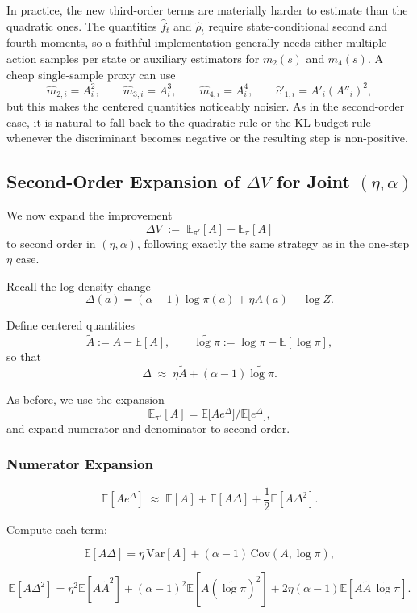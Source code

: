 \documentclass[11pt]{article}
\theoremstyle{definition}
\theoremstyle{remark}
\begin{document}
In practice, the new third-order terms are materially harder to estimate than the quadratic ones. The quantities $\hat f_t$ and $\hat\rho_t$ require state-conditional second and fourth moments, so a faithful implementation generally needs either multiple action samples per state or auxiliary estimators for $m_2(s)$ and $m_4(s)$. A cheap single-sample proxy can use
\[
  \hat m_{2,i}=A_i^2,\qquad
  \hat m_{3,i}=A_i^3,\qquad
  \hat m_{4,i}=A_i^4,\qquad
  \hat c'_{1,i}=A'_i (A''_i)^2,
\]
but this makes the centered quantities noticeably noisier. As in the second-order case, it is natural to fall back to the quadratic rule or the KL-budget rule whenever the discriminant becomes negative or the resulting step is non-positive.

\subsection*{Second-Order Expansion of $\Delta V$ for Joint $(\eta,\alpha)$}

We now expand the improvement
\[
\Delta V \;:=\; \mathbb{E}_{\pi'}[A] - \mathbb{E}_{\pi}[A]
\]
to second order in $(\eta,\alpha)$, following exactly the same strategy as in the one-step $\eta$ case.

Recall the log-density change
\[
\Delta(a)
=
(\alpha-1)\log \pi(a) + \eta A(a) - \log Z.
\]

Define centered quantities
\[
\tilde A := A - \mathbb{E}[A],
\qquad
\widetilde{\log \pi} := \log \pi - \mathbb{E}[\log \pi],
\]
so that
\[
\Delta \;\approx\; \eta \tilde A + (\alpha-1)\widetilde{\log \pi}.
\]

As before, we use the expansion
\[
\mathbb{E}_{\pi'}[A]
=
\mathbb{E}\big[A e^{\Delta}\big] \big/ \mathbb{E}\big[e^{\Delta}\big],
\]
and expand numerator and denominator to second order.

\subsubsection*{Numerator Expansion}

\[
\mathbb{E}[A e^{\Delta}]
\;\approx\;
\mathbb{E}[A]
+ \mathbb{E}[A \Delta]
+ \frac{1}{2}\mathbb{E}[A \Delta^2].
\]

Compute each term:

\[
\mathbb{E}[A \Delta]
=
\eta\,\mathrm{Var}[A]
+ (\alpha-1)\,\mathrm{Cov}(A,\log \pi),
\]

\[
\mathbb{E}[A \Delta^2]
=
\eta^2 \mathbb{E}[A \tilde A^2]
+ (\alpha-1)^2 \mathbb{E}[A (\widetilde{\log \pi})^2]
+ 2\eta(\alpha-1)\mathbb{E}[A \tilde A\,\widetilde{\log \pi}].
\]
\end{document}
